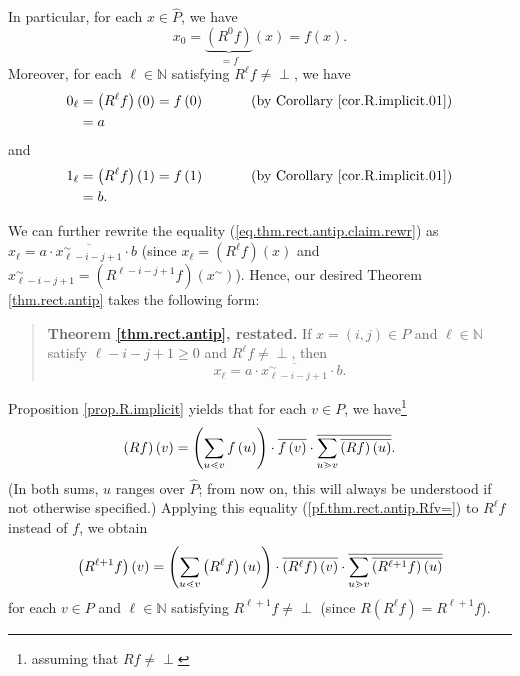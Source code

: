 \documentclass[numbers=enddot,12pt,final,onecolumn,notitlepage]{scrartcl}%
\theoremstyle{definition}
\newenvironment{verlong}{}{}
\newenvironment{vershort}{}{}
\newenvironment{statement}{\begin{quote}}{\end{quote}}
\newcommand{\undf}{\operatorname*{\bot}}
\let\sumnonlimits\sum
\renewcommand{\sum}{\sumnonlimits\limits}
\begin{document}
\begin{verlong}
In particular, for each $x\in\widehat{P}$, we have
\[
x_{0}=\underbrace{\left(  R^{0}f\right)  }_{=f}\left(  x\right)  =f\left(
x\right)  .
\]
Moreover, for each $\ell\in\mathbb{N}$ satisfying $R^{\ell}f\neq\undf$, we
have
\begin{align}
0_{\ell}  &  =\left(  R^{\ell}f\right)  \left(  0\right)  =f\left(  0\right)
\ \ \ \ \ \ \ \ \ \ \left(  \text{by Corollary \ref{cor.R.implicit.01}}\right)
\nonumber\\
&  =a \label{eq.0l.a}%
\end{align}
and
\begin{align}
1_{\ell}  &  =\left(  R^{\ell}f\right)  \left(  1\right)  =f\left(  1\right)
\ \ \ \ \ \ \ \ \ \ \left(  \text{by Corollary \ref{cor.R.implicit.01}}\right)
\nonumber\\
&  =b. \label{eq.1l.b}%
\end{align}

\end{verlong}

We can further rewrite the equality (\ref{eq.thm.rect.antip.claim.rewr}) as
$x_{\ell}=a\cdot\overline{x_{\ell-i-j+1}^{\sim}}\cdot b$ (since $x_{\ell
}=\left(  R^{\ell}f\right)  \left(  x\right)  $ and $x_{\ell-i-j+1}^{\sim
}=\left(  R^{\ell-i-j+1}f\right)  \left(  x^{\sim}\right)  $). Hence, our
desired Theorem \ref{thm.rect.antip} takes the following form:

\begin{statement}
\textbf{Theorem \ref{thm.rect.antip}, restated.} If $x=\left(  i,j\right)  \in
P$ and $\ell\in\mathbb{N}$ satisfy $\ell-i-j+1\geq0$ and $R^{\ell}f\neq\undf$,
then%
\begin{equation}
x_{\ell}=a\cdot\overline{x_{\ell-i-j+1}^{\sim}}\cdot b.
\label{pf.thm.rect.antip.restate1}%
\end{equation}

\end{statement}

\begin{vershort}
Proposition \ref{prop.R.implicit} yields that for each $v\in P$, we
have\footnote{assuming that $Rf\neq\undf$}%
\begin{equation}
\left(  Rf\right)  \left(  v\right)  =\left(  \sum\limits_{u\lessdot
v}f\left(  u\right)  \right)  \cdot\overline{f\left(  v\right)  }%
\cdot\overline{\sum\limits_{u\gtrdot v}\overline{\left(  Rf\right)  \left(
u\right)  }}. \label{pf.thm.rect.antip.Rfv=}%
\end{equation}
(In both sums, $u$ ranges over $\widehat{P}$; from now on, this will always be
understood if not otherwise specified.) Applying this equality
(\ref{pf.thm.rect.antip.Rfv=}) to $R^{\ell}f$ instead of $f$, we obtain%
\[
\left(  R^{\ell+1}f\right)  \left(  v\right)  =\left(  \sum\limits_{u\lessdot
v}\left(  R^{\ell}f\right)  \left(  u\right)  \right)  \cdot\overline{\left(
R^{\ell}f\right)  \left(  v\right)  }\cdot\overline{\sum\limits_{u\gtrdot
v}\overline{\left(  R^{\ell+1}f\right)  \left(  u\right)  }}%
\]
for each $v\in P$ and $\ell\in\mathbb{N}$ satisfying $R^{\ell+1}f\neq\undf$
(since $R\left(  R^{\ell}f\right)  =R^{\ell+1}f$).
\end{vershort}
\end{document}
